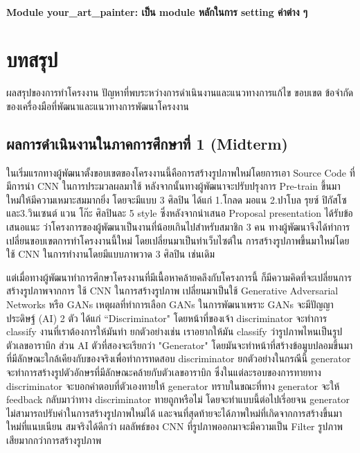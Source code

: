 \documentclass[12pt,oneside,openright,a4paper]{cpe-thai-project}
\begin{document}
\subsubsection{Module your\_art\_painter: เป็น module หลักในการ setting ค่าต่าง ๆ}





\chapter{บทสรุป}

ผลสรุปของการทำโครงงาน ปัญหาที่พบระหว่างการดำเนินงานและแนวทางการแก้ไข ขอบเขต ข้อจำกัดของเครื่องมือที่พัฒนาและแนวทางการพัฒนาโครงงาน

\section{ผลการดำเนินงานในภาคการศึกษาที่ 1 (Midterm)}
ในเริ่มแรกทางผู้พัฒนาตั้งขอบเขตของโครงงานนี้คือการสร้างรูปภาพใหม่โดยการเอา Source Code ที่มีการนำ CNN ในการประมวลผลมาใช้ หลังจากนั้นทางผู้พัฒนาจะปรับปรุงการ Pre-train ขึ้นมาใหม่ให้มีความเหมาะสมมากยิ่ง โดยจะมีแบบ 3 ศิลปิน ได้แก่ 1.โกลด มอแน 2.ปาโบล รุยซ์ ปิกัสโซ และ3.วินเซนต์ แวน โก๊ะ ศิลปินละ 5 style ซึ่งหลังจากนำเสนอ Proposal presentation ได้รับข้อเสนอแนะ ว่าโครงการของผู้พัฒนาเป็นงานที่น้อยเกินไปสำหรับสมาชิก 3 คน ทางผู้พัฒนาจึงได้ทำการเปลี่ยนขอบเขตการทำโครงงานนี้ใหม่ โดยเปลี่ยนมาเป็นทำเว็บไซต์ใน การสร้างรูปภาพขึ้นมาใหม่โดยใช้ CNN ในการทำงานโดยมีแบบภาพวาด 3 ศิลปิน เช่นเดิม 

\par\setlength{\parindent}{5ex}
แต่เมื่อทางผู้พัฒนาทำการศึกษาโครงงานที่มีเนื้อหาคล้ายคลึงกับโครงการนี้ ก็มีความคิดที่จะเปลี่ยนการสร้างรูปภาพจากการ ใช้ CNN ในการสร้างรูปภาพ เปลี่ยนมาเป็นใช้  Generative Adversarial Networks หรือ GANs เหตุผลที่ทำการเลือก GANs ในการพัฒนาเพราะ GANs จะมีปัญญาประดิษฐ์ (AI) 2 ตัว ได้แก่ “Discriminator" โดยหน้าที่ของเจ้า discriminator จะทำการ classify งานที่เราต้องการให้มันทำ ยกตัวอย่างเช่น เราอยากให้มัน classify ว่ารูปภาพไหนเป็นรูปตัวเลขอาราบิก ส่วน AI ตัวที่สองจะเรียกว่า "Generator" โดยมันจะทำหน้าที่สร้างข้อมูบปลอมขึ้นมาที่มีลักษณะใกล้เคียงกับของจริงเพื่อทำการทดสอบ discriminator ยกตัวอย่างในกรณีนี้ generator จะทำการสร้างรูปตัวอักษรที่มีลักษณะคล้ายกับตัวเลขอาราบิก ซึ่งในแต่ละรอบของการทายทาง discriminator จะบอกคำตอบที่ตัวเองทายให้ generator ทราบในขณะที่ทาง generator จะให้ feedback กลับมาว่าทาง discriminator ทายถูกหรือไม่ โดยจะทำแบบนี้ต่อไปเรี่อยจน generator ไม่สามารถปรับค่าในการสร้างรูปภาพใหม่ได้ และจนที่สุดท้ายจะได้ภาพใหม่ที่เกิดจากการสร้างขึ้นมาใหม่ที่แนบเนียน สมจริงได้ดีกว่า ผลลัพธ์ของ CNN ที่รูปภาพออกมาจะมีความเป็น Filter รูปภาพเสียมากกว่าการสร้างรูปภาพ 
\end{document}
